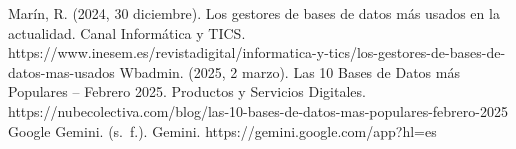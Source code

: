 \documentclass[12pt]{report}
\begin{document}
\begin{enumerate}[label=\roman*.]
\end{enumerate}

\begin{thebibliography}{99}
        Marín, R. (2024, 30 diciembre). Los gestores de bases de datos más usados en la actualidad. Canal Informática y TICS. https://www.inesem.es/revistadigital/informatica-y-tics/los-gestores-de-bases-de-datos-mas-usados
        Wbadmin. (2025, 2 marzo). Las 10 Bases de Datos más Populares – Febrero 2025. Productos y Servicios Digitales. https://nubecolectiva.com/blog/las-10-bases-de-datos-mas-populares-febrero-2025
        Google Gemini. (s. f.). Gemini. https://gemini.google.com/app?hl=es

\end{thebibliography}
\end{document}
